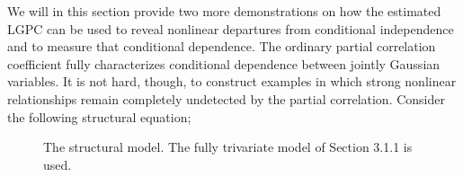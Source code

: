 \documentclass[
  12pt,
  letterpaper]{article}
\numberwithin{equation}{section}
\begin{document}
We will in this section provide two more demonstrations on how the estimated LGPC can be used to reveal nonlinear departures from conditional independence and to measure that conditional dependence. The ordinary partial correlation coefficient fully characterizes conditional dependence between jointly Gaussian variables. It is not hard, though, to construct examples in which strong nonlinear relationships remain completely undetected by the partial correlation. Consider the following structural equation;

\begin{figure}[t]
    \caption{The structural model. The fully trivariate model of Section 3.1.1 is used.}\label{fig:structural-plot}
\end{figure}
\end{document}
